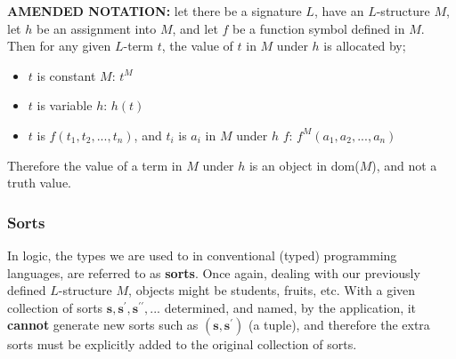 \documentclass[a4paper, 12pt]{article}
\begin{document}
                \textbf{AMENDED NOTATION:} let there be a signature $L$, have an $L$-structure $M$, let $h$ be an assignment into $M$, and let $f$ be a function symbol defined in $M$. Then for any given $L$-term $t$, the value of $t$ in $M$ under $h$ is allocated by;
                \begin{itemize}
                    \itemsep0em
                    \item $t$ is constant \hfill $M$: $t^M$
                    \item $t$ is variable \hfill $h$: $h(t)$
                    \item $t$ is $f(t_1, t_2, ..., t_n)$, and $t_i$ is $a_i$ in $M$ under $h$ \hfill $f$: $f^M(a_1, a_2, ..., a_n)$
                \end{itemize}
                Therefore the value of a term in $M$ under $h$ is an object in dom($M$), and not a truth value.
            \subsubsection*{Sorts}
                In logic, the types we are used to in conventional (typed) programming languages, are referred to as \textbf{sorts}. Once again, dealing with our previously defined $L$-structure $M$, objects might be students, fruits, etc. With a given collection of sorts $\mathbf{s}, \mathbf{s}^\prime, \mathbf{s}^{\prime\prime}, ...$ determined, and named, by the application, it \textbf{cannot} generate new sorts such as $(\mathbf{s}, \mathbf{s}^\prime)$ (a tuple), and therefore the extra sorts must be explicitly added to the original collection of sorts.
                \medskip
\end{document}
